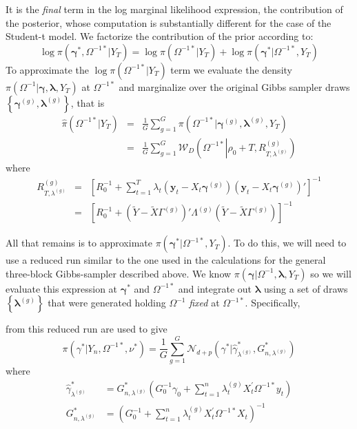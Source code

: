 \documentclass[12pt]{article}
\begin{document}
It is the \emph{final} term in the log marginal likelihood expression, the contribution of the posterior, whose computation is substantially different for the case of the Student-t model.
We factorize the contribution of the prior according to:
\begin{equation*}
  \log \pi(\boldsymbol{\gamma}^*, \Omega^{-1*}|Y_T) =  \log \pi\left( \Omega^{-1*}|Y_T \right) + \log \pi\left( \boldsymbol{\gamma}^*|\Omega^{-1*},Y_T \right) 
\end{equation*}
To approximate the $\log \pi(\Omega^{-1*}|Y_T)$ term we evaluate the density $\pi(\Omega^{-1}|\boldsymbol{\gamma},\boldsymbol{\lambda},Y_T)$ at $\Omega^{-1*}$ and marginalize over the original Gibbs sampler draws $\left\{ \boldsymbol{\gamma}^{(g)}, \boldsymbol{\lambda}^{(g)} \right\}$, that is
\begin{eqnarray*}
  \widehat{\pi}\left( \Omega^{-1*}|Y_T \right) &=& \frac{1}{G}\sum_{g=1}^G \pi\left( \Omega^{-1*}|\boldsymbol{\gamma}^{(g)},\boldsymbol{\lambda}^{(g)},Y_T \right)\\
  &=& \frac{1}{G}\sum_{g=1}^G \mathcal{W}_D\left(\Omega^{-1*}\left|\rho_0 + T, R_{T,\lambda^{(g)}}^{\left( g \right)}\right. \right) 
\end{eqnarray*}
where
\begin{eqnarray*}
  R^{(g)}_{T,\lambda^{(g)}} &=&  \left[ R_0^{-1} + \sum_{t=1}^{T} \lambda_t \left( \mathbf{y}_t - X_t \boldsymbol{\gamma}^{(g)} \right)\left( \mathbf{y}_t - X_t \boldsymbol{\gamma}^{(g)} \right)' \right]^{-1}\\
  &=& \left[  R_0^{-1} + \left( \widetilde{Y} - \widetilde{X} \Gamma^{(g)} \right)' \Lambda^{(g)}\left( \widetilde{Y} - \widetilde{X} \Gamma^{(g)} \right)\right]^{-1}
\end{eqnarray*}

All that remains is to approximate $\pi\left( \boldsymbol{\gamma}^*|\Omega^{-1*}, Y_T \right)$.
To do this, we will need to use a reduced run similar to the one used in the calculations for the general three-block Gibbs-sampler described above.
We know $\pi\left( \boldsymbol{\gamma}|\Omega^{-1}, \boldsymbol{\lambda},Y_T \right)$ so we will evaluate this expression at $\boldsymbol{\gamma}^*$ and $\Omega^{-1*}$ and integrate out $\boldsymbol{\lambda}$ using a set of draws $\left\{ \boldsymbol{\lambda}^{(g)} \right\}$ that were generated holding $\Omega^{-1}$ \emph{fixed} at $\Omega^{-1*}$.
Specifically,

from this reduced run are used to give
\begin{equation*}
\pi (\gamma ^{\ast }|Y_{n},\Omega ^{-1\ast },\nu ^{\ast })=\frac{1}{G}%
\sum_{g=1}^{G}\mathcal{N}_{d+p}\left( \gamma ^{\ast }|\hat{\gamma}_{\lambda
^{(g)}}^{\ast },G_{n,\lambda ^{(g)}}^{\ast }\right)
\end{equation*}%
where%
\begin{align*}
\hat{\gamma}_{\lambda ^{(g)}}^{\ast }& =G_{n,\lambda ^{(g)}}^{\ast }\left(
G_{0}^{-1}\gamma _{0}+\sum_{t=1}^{n}\lambda _{t}^{(g)}X_{t}^{\prime }\Omega
^{-1\ast }y_{t}\right)  \\
G_{n,\lambda ^{(g)}}^{\ast }& =\left( G_{0}^{-1}+\sum_{t=1}^{n}\lambda
_{t}^{(g)}X_{t}^{\prime }\Omega ^{-1\ast }X_{t}\right) ^{-1}
\end{align*}
\end{document}
